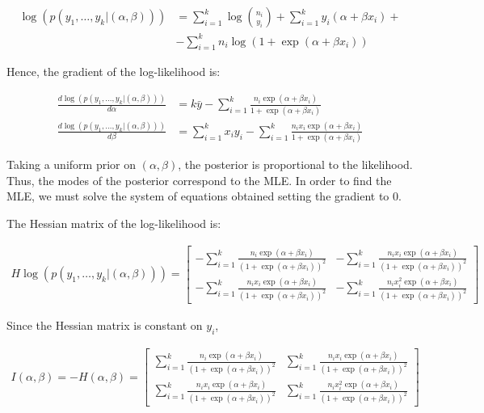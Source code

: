 \documentclass[11pt]{article}
\begin{document}
\begin{enumerate}
\begin{enumerate}
	\begin{align*}
		\log(p(y_{1},\ldots,y_{k}|(\alpha,\beta)))	&= \sum_{i=1}^{k}{\log{n_{i} \choose y_{i}}} + \sum_{i=1}^{k}{y_{i}(\alpha+\beta x_{i})}+ \\
																								&- \sum_{i=1}^{k}{n_{i}\log(1+\exp(\alpha + \beta x_{i}))}
	\end{align*}
	
	Hence, the gradient of the log-likelihood is:
	
	\begin{align*}
		\frac{d\log(p(y_{1},\ldots,y_{k}|(\alpha,\beta)))}{d\alpha}	&= k\bar{y} - \sum_{i=1}^{k}{\frac{n_{i}\exp(\alpha+\beta x_{i})}{1+\exp(\alpha+\beta x_{i})}} \\
		\frac{d\log(p(y_{1},\ldots,y_{k}|(\alpha,\beta)))}{d\beta}	&= \sum_{i=1}^{k}{x_{i}y_{i}} - \sum_{i=1}^{k}{\frac{n_{i} x_{i} \exp(\alpha+\beta x_{i})}{1+\exp(\alpha+\beta x_{i})}}
	\end{align*}

	Taking a uniform prior on $(\alpha,\beta)$, the posterior is proportional to the likelihood. Thus, the modes of the posterior correspond to the MLE. In order to find the MLE, we must solve the system of equations obtained setting the gradient to $0$.
	
	The Hessian matrix of the log-likelihood is:
	
	\begin{align*}
		H\log(p(y_{1},\ldots,y_{k}|(\alpha,\beta))) = 
		\left[ \begin{array}{cc}
		-\sum_{i=1}^{k}{\frac{n_{i}\exp(\alpha+\beta x_{i})}{(1+\exp(\alpha+\beta x_{i}))^{2}}} & - \sum_{i=1}^{k}{\frac{n_{i} x_{i} \exp(\alpha+\beta x_{i})}{(1+\exp(\alpha+\beta x_{i}))^{2}}} \\
		- \sum_{i=1}^{k}{\frac{n_{i} x_{i} \exp(\alpha+\beta x_{i})}{(1+\exp(\alpha+\beta x_{i}))^{2}}} & - \sum_{i=1}^{k}{\frac{n_{i} x_{i}^{2} \exp(\alpha+\beta x_{i})}{(1+\exp(\alpha+\beta x_{i}))^{2}}}
		\end{array} \right]
	\end{align*}
	
	Since the Hessian matrix is constant on $y_{i}$,
	
	\begin{align*}
		I(\alpha,\beta) = -H(\alpha,\beta) = \left[ \begin{array}{cc}
		\sum_{i=1}^{k}{\frac{n_{i}\exp(\alpha+\beta x_{i})}{(1+\exp(\alpha+\beta x_{i}))^{2}}} & \sum_{i=1}^{k}{\frac{n_{i} x_{i} \exp(\alpha+\beta x_{i})}{(1+\exp(\alpha+\beta x_{i}))^{2}}} \\
		\sum_{i=1}^{k}{\frac{n_{i} x_{i} \exp(\alpha+\beta x_{i})}{(1+\exp(\alpha+\beta x_{i}))^{2}}} & \sum_{i=1}^{k}{\frac{n_{i} x_{i}^{2} \exp(\alpha+\beta x_{i})}{(1+\exp(\alpha+\beta x_{i}))^{2}}}
		\end{array} \right]
	\end{align*}
	

\end{enumerate}
\end{enumerate}
\end{document}
